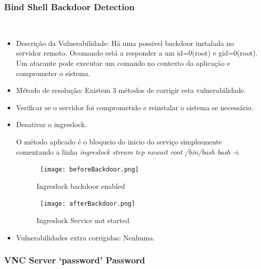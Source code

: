 \subsubsection{Bind Shell Backdoor Detection}
\hfill\\
\begin{itemize}
\item Descrição da Vulnerabilidade: Há uma possivel backdoor instalada no servidor remoto. Ocomando está a responder a um id=0(root) e gid=0(root). Um atacante pode executar um comando no contexto da aplicação e comprometer o sistema.

\item Método de resolução: Existem 3 métodos de corrigir esta vulnerabilidade.

\par\item Verificar se o servidor foi comprometido e reinstalar o sistema se necessário. 
\par\item Desativar o ingreslock.
\par O método aplicado é o bloqueio do inicio do serviço simplesmente comentando a linha \textit{ingreslock stream tcp nowait root /bin/bash bash -i}.
\begin{figure}[H]

  \centering

  \hbox{\hspace{-6em} \texttt{[image: beforeBackdoor.png]}}

  \caption {Ingreslock backdoor enabled}

  \label {fig3}

\end{figure}
\begin{figure}[H]

  \centering

  \hbox{\hspace{-6em} \texttt{[image: afterBackdoor.png]}}

  \caption {Ingreslock Service not started}

  \label {fig3}

\end{figure}
\item Vulnerabilidades extra corrigidas: Nenhuma.
\end{itemize}

\subsubsection{VNC Server ‘password’ Password}
\hfill\\

